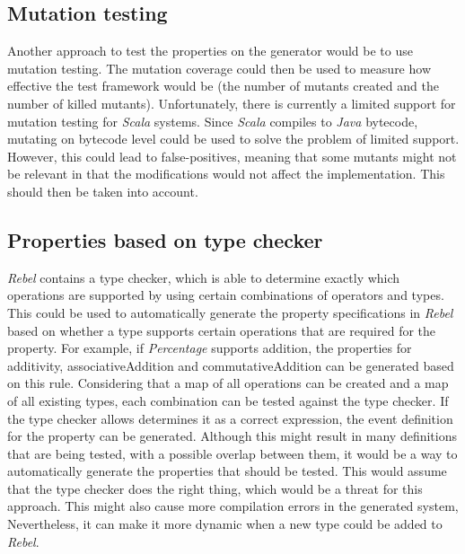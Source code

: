 \subsection*{Mutation testing}
Another approach to test the properties on the generator would be to use
mutation testing. The mutation coverage could then be used to measure how
effective the test framework would be (the number of mutants created and the
number of killed mutants). Unfortunately, there is currently a limited support
for mutation testing for \textit{Scala}
systems. Since
\textit{Scala} compiles to \textit{Java} bytecode, mutating on bytecode level
could be used to solve the problem of limited support. However, this could lead
to false-positives, meaning that some mutants might not be relevant in that the
modifications would not affect the implementation. This should then be taken
into account.

\subsection*{Properties based on type checker}
\textit{Rebel} contains a type checker, which is able to determine exactly
which operations are supported by using certain combinations of operators and
types. This could be used to automatically generate the property specifications
in \textit{Rebel} based on whether a type supports certain operations that are
required for the property. For example, if \textit{Percentage} supports
addition, the properties for additivity, associativeAddition and
commutativeAddition can be generated based on this rule. Considering that a map
of all operations can be created and a map of all existing types, each
combination can be tested against the type checker. If the type checker allows
determines it as a correct expression, the event definition for the property can
be generated. Although this might result in many definitions that are being
tested, with a possible overlap between them, it would be a way to automatically
generate the properties that should be tested. This would assume that the type
checker does the right thing, which would be a threat for this approach. This
might also cause more compilation errors in the generated system, Nevertheless,
it can make it more dynamic when a new type could be added to \textit{Rebel}.
